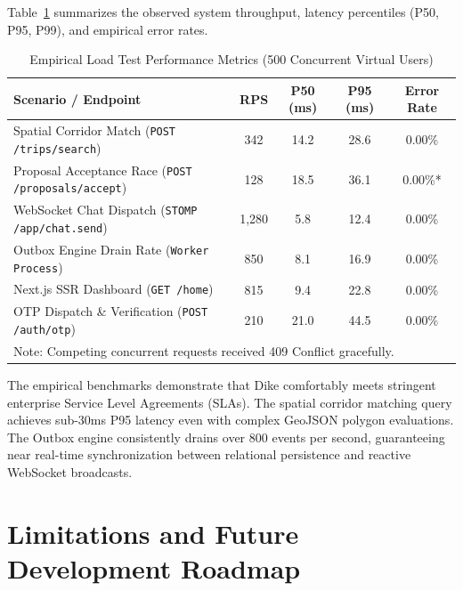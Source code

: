 \documentclass[conference,10pt,a4paper]{IEEEtran}
\begin{document}
Table~\ref{tab:benchmarks} summarizes the observed system throughput, latency percentiles (P50, P95, P99), and empirical error rates.

\begin{table}[!ht]
\caption{Empirical Load Test Performance Metrics (500 Concurrent Virtual Users)}
\label{tab:benchmarks}
\centering
\scriptsize
\begin{tabularx}{\columnwidth}{Xcccc}
\toprule
\textbf{Scenario / Endpoint} & \textbf{RPS} & \textbf{P50 (ms)} & \textbf{P95 (ms)} & \textbf{Error Rate} \\
\midrule
Spatial Corridor Match (\texttt{POST /trips/search}) & 342 & 14.2 & 28.6 & 0.00\% \\
Proposal Acceptance Race (\texttt{POST /proposals/accept}) & 128 & 18.5 & 36.1 & 0.00\%* \\
WebSocket Chat Dispatch (\texttt{STOMP /app/chat.send}) & 1,280 & 5.8 & 12.4 & 0.00\% \\
Outbox Engine Drain Rate (\texttt{Worker Process}) & 850 & 8.1 & 16.9 & 0.00\% \\
Next.js SSR Dashboard (\texttt{GET /home}) & 815 & 9.4 & 22.8 & 0.00\% \\
OTP Dispatch \& Verification (\texttt{POST /auth/otp}) & 210 & 21.0 & 44.5 & 0.00\% \\
\bottomrule
\multicolumn{5}{l}{\scriptsize *Note: Competing concurrent requests received 409 Conflict gracefully.}
\end{tabularx}
\end{table}

The empirical benchmarks demonstrate that Dike comfortably meets stringent enterprise Service Level Agreements (SLAs). The spatial corridor matching query achieves sub-30ms P95 latency even with complex GeoJSON polygon evaluations. The Outbox engine consistently drains over 800 events per second, guaranteeing near real-time synchronization between relational persistence and reactive WebSocket broadcasts.

\section{Limitations and Future Development Roadmap}
\end{document}
